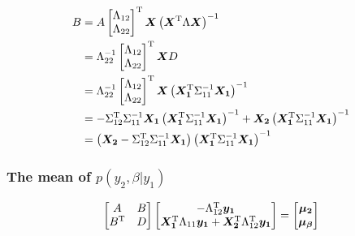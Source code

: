 \documentclass[twoside]{article}
\begin{document}

\begin{align*}
B
&=
A
\begin{bmatrix} 
\Lambda_{12} \\
\Lambda_{22}
\end{bmatrix}^\mathrm{T}
\bm{X}
\left(\bm{X}^\mathrm{T}\Lambda\bm{X}\right)^{-1}
\\
&=
\Lambda_{22}^{-1}
\begin{bmatrix} 
\Lambda_{12} \\
\Lambda_{22}
\end{bmatrix}^\mathrm{T}
\bm{X}
D
\\
&=
\Lambda_{22}^{-1}
\begin{bmatrix} 
\Lambda_{12} \\
\Lambda_{22}
\end{bmatrix}^\mathrm{T}
\bm{X}
\left(\bm{X_1}^\mathrm{T}\Sigma_{11}^{-1}\bm{X_1}\right)^{-1}
\\
&=
-\Sigma_{12}^\mathrm{T}
\Sigma_{11}^{-1}
\bm{X_1}
\left(\bm{X_1}^\mathrm{T}\Sigma_{11}^{-1}\bm{X_1}\right)^{-1}
+
\bm{X_2}
\left(\bm{X_1}^\mathrm{T}\Sigma_{11}^{-1}\bm{X_1}\right)^{-1}
\\
&=
\left(
\bm{X_2}
-
\Sigma_{12}^\mathrm{T}
\Sigma_{11}^{-1}
\bm{X_1}
\right)
\left(\bm{X_1}^\mathrm{T}\Sigma_{11}^{-1}\bm{X_1}\right)^{-1}
\end{align*}


\subsubsection{The mean of $p(y_2,\beta|y_1)$}
\begin{align*}
\begin{bmatrix}
A
& 
B
\\
B^\mathrm{T}
&
D
\end{bmatrix}
\begin{bmatrix}
    -\Lambda_{12}^\mathrm{T}\bm{y_1}
\\
    \bm{X_1}^\mathrm{T}\Lambda_{11}\bm{y_1}
    +
    \bm{X_2}^\mathrm{T}\Lambda_{12}^\mathrm{T}\bm{y_1}    
\end{bmatrix}
=
\begin{bmatrix}
\bm{\mu_2}
\\
\bm{\mu_\beta}
\end{bmatrix}
\end{align*}

\end{document}
